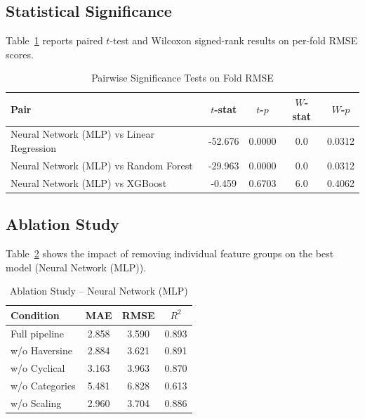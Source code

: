 \documentclass[conference]{IEEEtran}
\begin{document}
\subsection{Statistical Significance}

Table~\ref{tab:sig} reports paired $t$-test and Wilcoxon signed-rank results
on per-fold RMSE scores.

\begin{table}[H]
\centering
\caption{Pairwise Significance Tests on Fold RMSE}
\label{tab:sig}
\begin{tabular}{lcccc}
\toprule
\textbf{Pair} & \textbf{$t$-stat} & \textbf{$t$-$p$} & \textbf{$W$-stat} & \textbf{$W$-$p$} \\
\midrule
        Neural Network (MLP) vs Linear Regression & -52.676 & 0.0000 & 0.0 & 0.0312 \\
        Neural Network (MLP) vs Random Forest & -29.963 & 0.0000 & 0.0 & 0.0312 \\
        Neural Network (MLP) vs XGBoost & -0.459 & 0.6703 & 6.0 & 0.4062 \\
\bottomrule
\end{tabular}
\end{table}

\subsection{Ablation Study}

Table~\ref{tab:ablation} shows the impact of removing individual feature
groups on the best model (Neural Network (MLP)).

\begin{table}[H]
\centering
\caption{Ablation Study – Neural Network (MLP)}
\label{tab:ablation}
\begin{tabular}{lccc}
\toprule
\textbf{Condition} & \textbf{MAE} & \textbf{RMSE} & \textbf{$R^2$} \\
\midrule
        Full pipeline & 2.858 & 3.590 & 0.893 \\
        w/o Haversine & 2.884 & 3.621 & 0.891 \\
        w/o Cyclical & 3.163 & 3.963 & 0.870 \\
        w/o Categories & 5.481 & 6.828 & 0.613 \\
        w/o Scaling & 2.960 & 3.704 & 0.886 \\
\bottomrule
\end{tabular}
\end{table}
\end{document}
